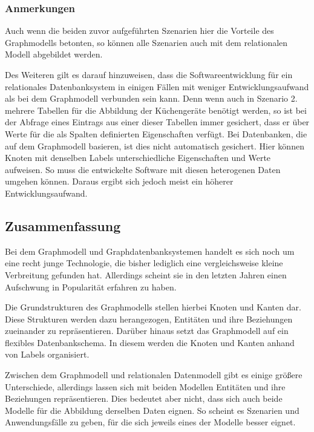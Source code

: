 \subsubsection{Anmerkungen}
Auch wenn die beiden zuvor aufgeführten Szenarien hier die Vorteile des Graphmodells betonten, so können alle Szenarien auch mit dem relationalen Modell abgebildet werden. 

Des Weiteren gilt es darauf hinzuweisen, dass die Softwareentwicklung für ein relationales Datenbanksystem in einigen Fällen mit weniger Entwicklungsaufwand als bei dem Graphmodell verbunden sein kann. Denn wenn auch in Szenario 2. mehrere Tabellen für die Abbildung der Küchengeräte benötigt werden, so ist bei der Abfrage eines Eintrags aus einer dieser Tabellen immer gesichert, dass er über Werte für die als Spalten definierten Eigenschaften verfügt. Bei Datenbanken, die auf dem Graphmodell basieren, ist dies nicht automatisch gesichert. Hier können Knoten mit denselben Labels unterschiedliche Eigenschaften und Werte aufweisen. So muss die entwickelte Software mit diesen heterogenen Daten umgehen können. Daraus ergibt sich jedoch meist ein höherer Entwicklungsaufwand. 

\subsection{Zusammenfassung}
Bei dem Graphmodell und Graphdatenbanksystemen handelt es sich noch um eine recht junge Technologie, die bisher lediglich eine vergleichsweise kleine Verbreitung gefunden hat. Allerdings scheint sie in den letzten Jahren einen Aufschwung in Popularität erfahren zu haben. 

Die Grundstrukturen des Graphmodells stellen hierbei Knoten und Kanten dar. Diese Strukturen werden dazu herangezogen, Entitäten und ihre Beziehungen zueinander zu repräsentieren. Darüber hinaus setzt das Graphmodell auf ein flexibles Datenbankschema. In diesem werden die Knoten und Kanten anhand von Labels organisiert.

Zwischen dem Graphmodell und relationalen Datenmodell gibt es einige größere Unterschiede, allerdings lassen sich mit beiden Modellen Entitäten und ihre Beziehungen repräsentieren. Dies bedeutet aber nicht, dass sich auch beide Modelle für die Abbildung derselben Daten eignen. So scheint es Szenarien und Anwendungsfälle zu geben, für die sich jeweils eines der Modelle besser eignet. 